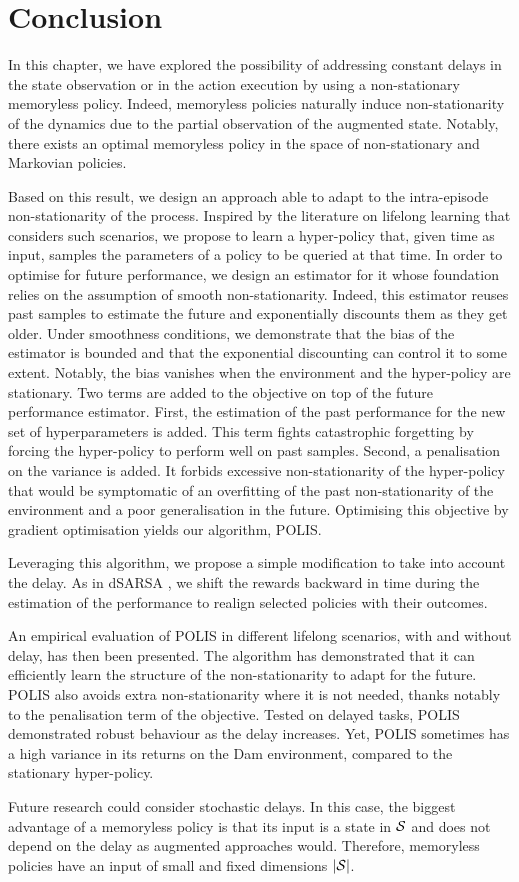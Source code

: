 \section{Conclusion}
In this chapter, we have explored the possibility of addressing constant delays in the state observation or in the action execution by using a non-stationary memoryless policy. 
Indeed, memoryless policies naturally induce non-stationarity of the dynamics due to the partial observation of the augmented state.
Notably, there exists an optimal memoryless policy in the space of non-stationary and Markovian policies\cite[Theorem~5.1]{derman2021acting}.

Based on this result, we design an approach able to adapt to the intra-episode non-stationarity of the process. 
Inspired by the literature on lifelong learning that considers such scenarios, we propose to learn a hyper-policy that, given time as input, samples the parameters of a policy to be queried at that time.
In order to optimise for future performance, we design an estimator for it whose foundation relies on the assumption of smooth non-stationarity.
Indeed, this estimator reuses past samples to estimate the future and exponentially discounts them as they get older.
Under smoothness conditions, we demonstrate that the bias of the estimator is bounded and that the exponential discounting can control it to some extent. 
Notably, the bias vanishes when the environment and the hyper-policy are stationary.
Two terms are added to the objective on top of the future performance estimator.
First, the estimation of the past performance for the new set of hyperparameters is added. 
This term fights catastrophic forgetting by forcing the hyper-policy to perform well on past samples. 
Second, a penalisation on the variance is added. 
It forbids excessive non-stationarity of the hyper-policy that would be symptomatic of an overfitting of the past non-stationarity of the environment and a poor generalisation in the future.
Optimising this objective by gradient optimisation yields our algorithm, POLIS.

Leveraging this algorithm, we propose a simple modification to take into account the delay. 
As in dSARSA \cite{schuitema2010control}, we shift the rewards backward in time during the estimation of the performance to realign selected policies with their outcomes.

An empirical evaluation of POLIS in different lifelong scenarios, with and without delay, has then been presented. 
The algorithm has demonstrated that it can efficiently learn the structure of the non-stationarity to adapt for the future.
POLIS also avoids extra non-stationarity where it is not needed, thanks notably to the penalisation term of the objective.
Tested on delayed tasks, POLIS demonstrated robust behaviour as the delay increases.
Yet, POLIS sometimes has a high variance in its returns on the Dam environment, compared to the stationary hyper-policy.

Future research could consider stochastic delays. 
In this case, the biggest advantage of a memoryless policy is that its input is a state in $\mathcal{S}$ and does not depend on the delay as augmented approaches would. 
Therefore, memoryless policies have an input of small and fixed dimensions $\lvert \mathcal{S}\rvert$. 